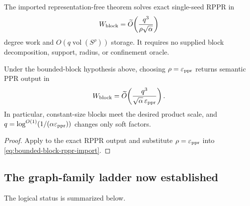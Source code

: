 The imported representation-free theorem solves exact single-seed RPPR in
\begin{equation}
 W_{\rm block}
 =\widetilde O\!\left(
  \frac{q^3}{\rho\sqrt\alpha}
 \right)
 \label{eq:bounded-block-rppr-import}
\end{equation}
degree work and $O(q\operatorname{vol}(S^\rho))$ storage.  It requires no
supplied block decomposition, support, radius, or confinement oracle.

\begin{corollary}
\label{cor:bounded-block-semantic-ppr}
Under the bounded-block hypothesis above, choosing
$\rho=\varepsilon_{\rm ppr}$ returns semantic PPR output in
\begin{equation}
 W_{\rm block}
 =\widetilde O\!\left(
  \frac{q^3}{\sqrt\alpha\,\varepsilon_{\rm ppr}}
 \right).
 \label{eq:bounded-block-ppr-work}
\end{equation}
In particular, constant-size blocks meet the desired product scale, and
$q=\log^{O(1)}(1/(\alpha\varepsilon_{\rm ppr}))$ changes only soft factors.
\end{corollary}

\begin{proof}
Apply  to the exact RPPR output and substitute
$\rho=\varepsilon_{\rm ppr}$ into
\eqref{eq:bounded-block-rppr-import}.
\end{proof}

\subsection{The graph-family ladder now established}

The logical status is summarized below.

